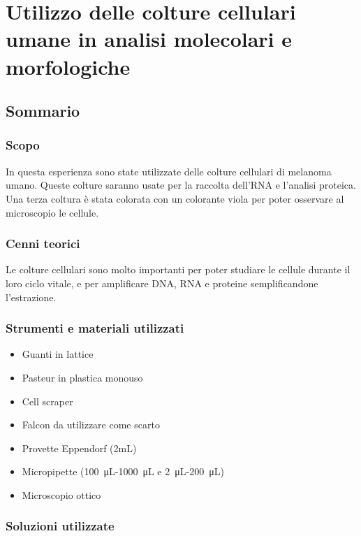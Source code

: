 \chapter{Utilizzo delle colture cellulari umane in analisi molecolari e morfologiche}

\vspace{0.6cm}

\section{Sommario}

\subsection{Scopo}

In questa esperienza sono state utilizzate delle colture cellulari
di melanoma umano.
Queste colture saranno usate per la raccolta dell'RNA e l'analisi proteica.
Una terza coltura è stata colorata con un colorante viola per poter
osservare al microscopio le cellule.

\subsection{Cenni teorici}

Le colture cellulari sono molto importanti per poter studiare le cellule durante
il loro ciclo vitale, e per amplificare DNA, RNA e proteine semplificandone l'estrazione.

\subsection{Strumenti e materiali utilizzati}

\begin{itemize}
\item Guanti in lattice
\item Pasteur in plastica monouso
\item Cell scraper
\item Falcon da utilizzare come scarto
\item Provette Eppendorf (2mL)
\item Micropipette (\SI{100}{\micro\liter}-\SI{1000}{\micro\liter} e \SI{2}{\micro\liter}-\SI{200}{\micro\liter})
\item Microscopio ottico
\end{itemize}

\subsection{Soluzioni utilizzate}

